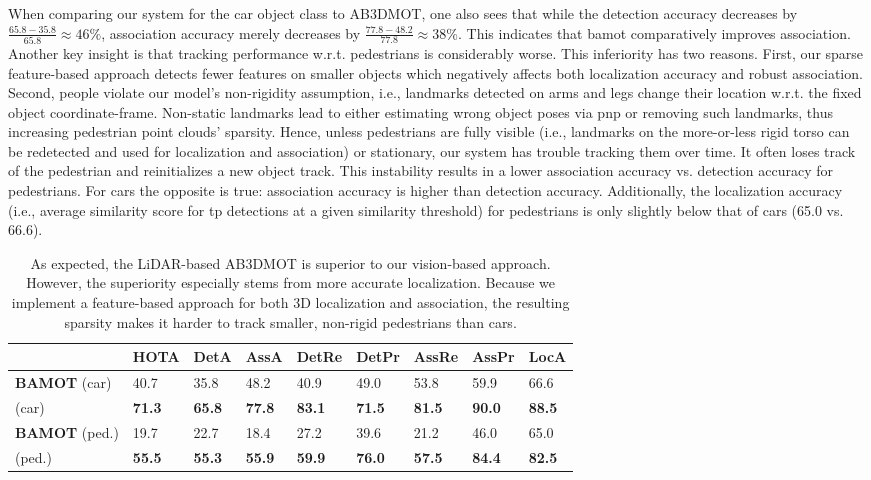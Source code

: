 \documentclass[headsepline, hidelinks, footsepline, footinclude=false, oneside, fontsize=11pt, paper=a4, listof=totoc, bibliography=totoc]{scrbook}
\begin{document}
When comparing our system for the car object class to AB3DMOT, one also sees that while the detection accuracy decreases by \(\frac{65.8-35.8}{65.8} \approx 46 \%\), association accuracy merely decreases by
\(\frac{77.8-48.2}{77.8} \approx 38 \%\). This indicates that \gls{bamot} comparatively improves association.
Another key insight is that tracking performance w.r.t. pedestrians is considerably worse. 
This inferiority has two reasons. First, our sparse feature-based approach detects fewer features on smaller objects which negatively affects both localization accuracy and robust association.
Second, people violate our model's non-rigidity assumption, i.e., landmarks detected on arms and legs change their location w.r.t. the fixed object coordinate-frame.
Non-static landmarks lead to either estimating wrong object poses via \gls{pnp} or removing such landmarks, thus increasing pedestrian point clouds' sparsity.
Hence, unless pedestrians are fully visible (i.e., landmarks on the more-or-less rigid torso can be redetected and used for localization and association) or stationary, our system has trouble tracking them over time.
It often loses track of the pedestrian and reinitializes a new object track. 
This instability results in a lower association accuracy vs. detection accuracy for pedestrians.
For cars the opposite is true: association accuracy is higher than detection accuracy.
Additionally, the localization accuracy (i.e., average similarity score for \gls{tp} detections at a given similarity threshold) for pedestrians is only slightly below that of cars (65.0 vs. 66.6).

\begin{table}
\centering
{} {

\begin{tabular}{lllllllll}
 & HOTA & DetA & AssA & DetRe & DetPr & AssRe & AssPr & LocA\\
\hline
\textbf{BAMOT} (car) & 40.7 & 35.8 & 48.2 & 40.9 & 49.0 & 53.8 & 59.9 & 66.6\\
\cite{wengBaseline3DMultiObject2019} (car) & \textbf{71.3} & \textbf{65.8} & \textbf{77.8} & \textbf{83.1} & \textbf{71.5} & \textbf{81.5} & \textbf{90.0} & \textbf{88.5}\\
\hline
\textbf{BAMOT} (ped.) & 19.7 & 22.7 & 18.4 & 27.2 & 39.6 & 21.2 & 46.0 & 65.0\\
\cite{wengBaseline3DMultiObject2019} (ped.) & \textbf{55.5} & \textbf{55.3} & \textbf{55.9} & \textbf{59.9} & \textbf{76.0} & \textbf{57.5} & \textbf{84.4} & \textbf{82.5}\\
\end{tabular}

}
\caption{As expected, the LiDAR-based AB3DMOT is superior to our vision-based approach. However, the superiority especially stems from more accurate localization.
Because we implement a feature-based approach for both 3D localization and association, the resulting sparsity makes it harder to track smaller, non-rigid pedestrians than cars.}
\label{tab:hota}
\end{table}
\end{document}

